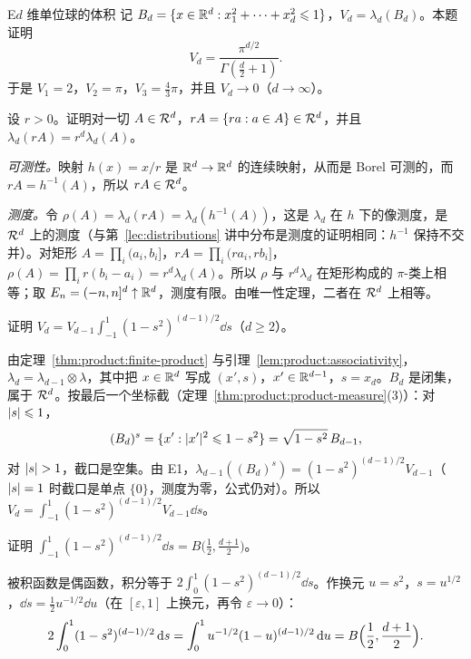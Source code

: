 \begin{probleme}{E}{$d$ 维单位球的体积}
记 $B_d=\{x\in\mathbb{R}^d:x_1^2+\cdots+x_d^2\leqslant1\}$，$V_d=\lambda_d(B_d)$。本题证明
\[
V_d=\frac{\pi^{d/2}}{\Gamma(\frac d2+1)}.
\]
于是 $V_1=2$，$V_2=\pi$，$V_3=\frac43\pi$，并且 $V_d\to0$（$d\to\infty$）。
\begin{questions}
\item 设 $r>0$。证明对一切 $A\in\mathcal{R}^d$，$rA=\{ra:a\in A\}\in\mathcal{R}^d$，并且 $\lambda_d(rA)=r^d\lambda_d(A)$。
\begin{solution}
\emph{可测性。}映射 $h(x)=x/r$ 是 $\mathbb{R}^d\to\mathbb{R}^d$ 的连续映射，从而是 Borel 可测的，而 $rA=h^{-1}(A)$，所以 $rA\in\mathcal{R}^d$。

\emph{测度。}令 $\rho(A)=\lambda_d(rA)=\lambda_d(h^{-1}(A))$，这是 $\lambda_d$ 在 $h$ 下的像测度，是 $\mathcal{R}^d$ 上的测度（与第~\ref{lec:distributions} 讲中分布是测度的证明相同：$h^{-1}$ 保持不交并）。对矩形 $A=\prod_i(a_i,b_i]$，$rA=\prod_i(ra_i,rb_i]$，$\rho(A)=\prod_ir(b_i-a_i)=r^d\lambda_d(A)$。所以 $\rho$ 与 $r^d\lambda_d$ 在矩形构成的 $\pi$-类上相等；取 $E_n=(-n,n]^d\uparrow\mathbb{R}^d$，测度有限。由唯一性定理，二者在 $\mathcal{R}^d$ 上相等。
\end{solution}

\item 证明 $V_d=V_{d-1}\int_{-1}^1(1-s^2)^{(d-1)/2}\dd s$（$d\geqslant2$）。
\begin{solution}
由定理~\ref{thm:product:finite-product} 与引理~\ref{lem:product:associativity}，$\lambda_d=\lambda_{d-1}\otimes\lambda$，其中把 $x\in\mathbb{R}^d$ 写成 $(x',s)$，$x'\in\mathbb{R}^{d-1}$，$s=x_d$。$B_d$ 是闭集，属于 $\mathcal{R}^d$。按最后一个坐标截（定理~\ref{thm:product:product-measure}(3)）：对 $\lvert s\rvert\leqslant1$，
\[
(B_d)^s=\{x':\lvert x'\rvert^2\leqslant1-s^2\}=\sqrt{1-s^2}\,B_{d-1},
\]
对 $\lvert s\rvert>1$，截口是空集。由 E1，$\lambda_{d-1}((B_d)^s)=(1-s^2)^{(d-1)/2}V_{d-1}$（$\lvert s\rvert=1$ 时截口是单点 $\{0\}$，测度为零，公式仍对）。所以 $V_d=\int_{-1}^1(1-s^2)^{(d-1)/2}V_{d-1}\dd s$。
\end{solution}

\item 证明 $\int_{-1}^1(1-s^2)^{(d-1)/2}\dd s=B\bigl(\frac12,\frac{d+1}2\bigr)$。
\begin{solution}
被积函数是偶函数，积分等于 $2\int_0^1(1-s^2)^{(d-1)/2}\dd s$。作换元 $u=s^2$，$s=u^{1/2}$，$\dd s=\frac12u^{-1/2}\dd u$（在 $[\varepsilon,1]$ 上换元，再令 $\varepsilon\to0$）：
\[
2\int_0^1(1-s^2)^{(d-1)/2}\,\mathrm{d} s=\int_0^1u^{-1/2}(1-u)^{(d-1)/2}\,\mathrm{d} u=B\Bigl(\frac12,\frac{d+1}2\Bigr).
\]
\end{solution}


\end{questions}
\end{probleme}
